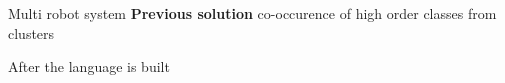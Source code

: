 \section{}
    \begin{frame}[allowframebreaks]{Multi robot system}
        \textbf{Previous solution}
        co-occurence of high order classes from clusters
        
        After the language is built
    
    
    \end{frame}


\section{}
    
    